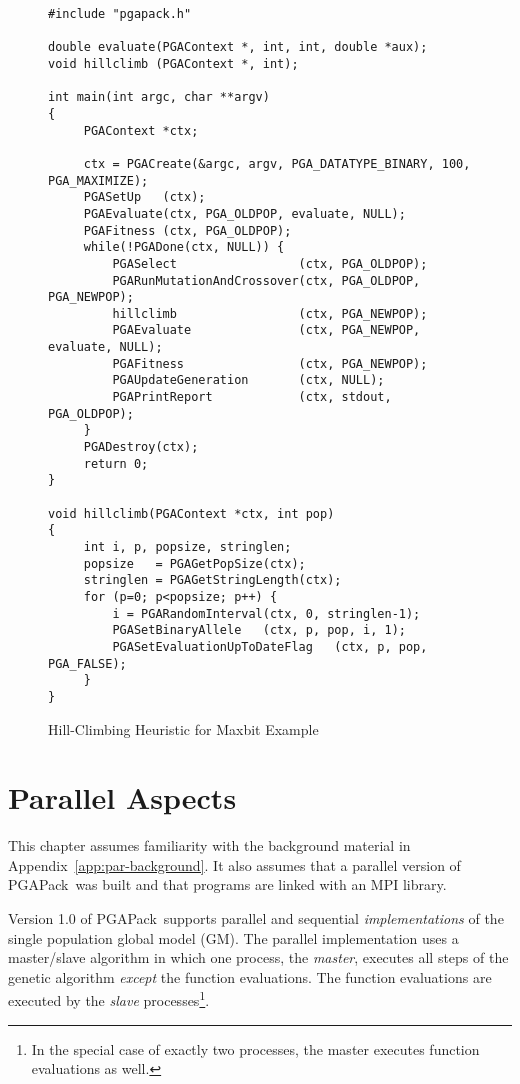 \documentclass{report}
\newcommand{\pga}{PGAPack}
\begin{document}
\begin{figure}[th]
\begin{verbatim}
#include "pgapack.h"

double evaluate(PGAContext *, int, int, double *aux);
void hillclimb (PGAContext *, int);

int main(int argc, char **argv)
{
     PGAContext *ctx;

     ctx = PGACreate(&argc, argv, PGA_DATATYPE_BINARY, 100, PGA_MAXIMIZE);
     PGASetUp   (ctx);
     PGAEvaluate(ctx, PGA_OLDPOP, evaluate, NULL);  
     PGAFitness (ctx, PGA_OLDPOP);
     while(!PGADone(ctx, NULL)) {
         PGASelect                 (ctx, PGA_OLDPOP);
         PGARunMutationAndCrossover(ctx, PGA_OLDPOP, PGA_NEWPOP);
         hillclimb                 (ctx, PGA_NEWPOP);
         PGAEvaluate               (ctx, PGA_NEWPOP, evaluate, NULL);
         PGAFitness                (ctx, PGA_NEWPOP);
         PGAUpdateGeneration       (ctx, NULL);
         PGAPrintReport            (ctx, stdout, PGA_OLDPOP);
     }
     PGADestroy(ctx);
     return 0;
}

void hillclimb(PGAContext *ctx, int pop)
{
     int i, p, popsize, stringlen;
     popsize   = PGAGetPopSize(ctx);
     stringlen = PGAGetStringLength(ctx);
     for (p=0; p<popsize; p++) {
         i = PGARandomInterval(ctx, 0, stringlen-1);
         PGASetBinaryAllele   (ctx, p, pop, i, 1);
         PGASetEvaluationUpToDateFlag   (ctx, p, pop, PGA_FALSE);
     }
}
\end{verbatim}
\caption{Hill-Climbing Heuristic for Maxbit Example}\label{example:hill}
\end{figure}

\chapter{Parallel Aspects}\label{chp:parallel}

This chapter assumes familiarity with the background material in
Appendix~\ref{app:par-background}.  It also assumes that a parallel version of
\pga\ was built and that programs are linked with
an MPI library.

Version 1.0 of \pga\ supports parallel and sequential {\em implementations} of
the single population global model (GM).  The parallel implementation uses a
master/slave algorithm in which one process, the {\em master}, executes all
steps of the genetic algorithm {\em except} the function evaluations.  The
function evaluations are executed by the {\em slave} processes\footnote{In the
special case of exactly two processes, the master executes function
evaluations as well.}.
\end{document}
